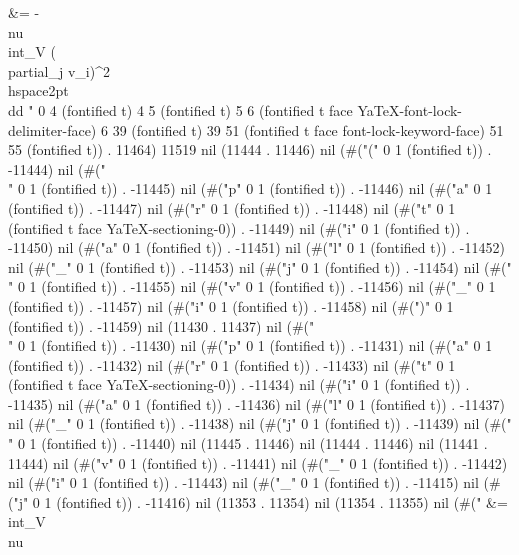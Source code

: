 {{ &= - \\nu\\int_V (\\partial_j v_i)^2 \\hspace{2pt}\\dd " 0 4 (fontified t) 4 5 (fontified t) 5 6 (fontified t face YaTeX-font-lock-delimiter-face) 6 39 (fontified t) 39 51 (fontified t face font-lock-keyword-face) 51 55 (fontified t)) . 11464) 11519 nil (11444 . 11446) nil (#("(" 0 1 (fontified t)) . -11444) nil (#("\\" 0 1 (fontified t)) . -11445) nil (#("p" 0 1 (fontified t)) . -11446) nil (#("a" 0 1 (fontified t)) . -11447) nil (#("r" 0 1 (fontified t)) . -11448) nil (#("t" 0 1 (fontified t face YaTeX-sectioning-0)) . -11449) nil (#("i" 0 1 (fontified t)) . -11450) nil (#("a" 0 1 (fontified t)) . -11451) nil (#("l" 0 1 (fontified t)) . -11452) nil (#("_" 0 1 (fontified t)) . -11453) nil (#("j" 0 1 (fontified t)) . -11454) nil (#(" " 0 1 (fontified t)) . -11455) nil (#("v" 0 1 (fontified t)) . -11456) nil (#("_" 0 1 (fontified t)) . -11457) nil (#("i" 0 1 (fontified t)) . -11458) nil (#(")" 0 1 (fontified t)) . -11459) nil (11430 . 11437) nil (#("\\" 0 1 (fontified t)) . -11430) nil (#("p" 0 1 (fontified t)) . -11431) nil (#("a" 0 1 (fontified t)) . -11432) nil (#("r" 0 1 (fontified t)) . -11433) nil (#("t" 0 1 (fontified t face YaTeX-sectioning-0)) . -11434) nil (#("i" 0 1 (fontified t)) . -11435) nil (#("a" 0 1 (fontified t)) . -11436) nil (#("l" 0 1 (fontified t)) . -11437) nil (#("_" 0 1 (fontified t)) . -11438) nil (#("j" 0 1 (fontified t)) . -11439) nil (#(" " 0 1 (fontified t)) . -11440) nil (11445 . 11446) nil (11444 . 11446) nil (11441 . 11444) nil (#("v" 0 1 (fontified t)) . -11441) nil (#("_" 0 1 (fontified t)) . -11442) nil (#("i" 0 1 (fontified t)) . -11443) nil (#("_" 0 1 (fontified t)) . -11415) nil (#("j" 0 1 (fontified t)) . -11416) nil (11353 . 11354) nil (11354 . 11355) nil (#(" &= \\int_V \\nu
}}
